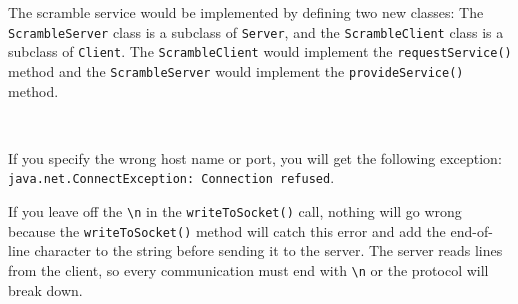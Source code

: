 \begin{ANS}
\item  The scramble service would be implemented by defining
two new classes: The {\tt ScrambleServer} class is a
subclass of {\tt Server}, and the {\tt ScrambleClient} class
is a subclass of {\tt Client}.
The {\tt ScrambleClient} would implement the {\tt requestService()}
method and the {\tt ScrambleServer} would implement the
{\tt provideService()} method.

\item  \mbox{ }
\begin{ANSBL}
\item  If you specify the wrong host name or port, you will get the
following exception:
{\tt java.net.Connect\-Exception: Connection refused}.

\item  If you leave off the \verb|\n| in the {\tt writeToSocket()}
call, nothing will go wrong because the {\tt writeToSocket()} method
will catch this error and add the end-of-line character to the string
before sending it to the server.   The server reads lines from the
client, so every communication must end with \verb|\n| or the protocol
will break down.
\end{ANSBL}
\end{ANS}


